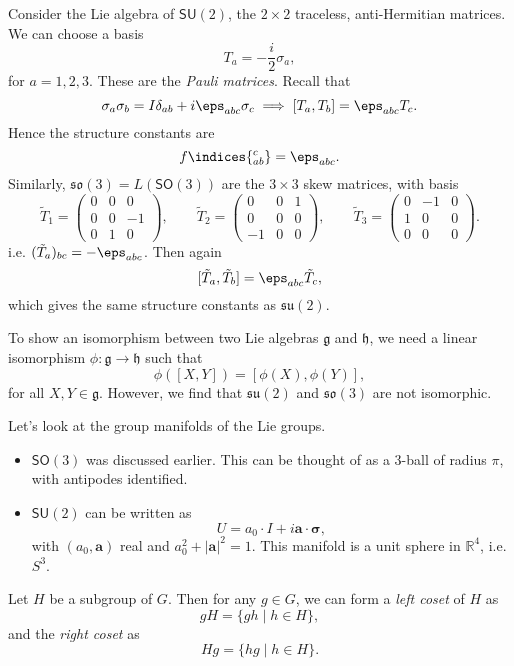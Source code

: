 \documentclass[12pt]{article}
\begin{document}
Consider the Lie algebra of $\mathsf{SU}(2)$, the $2 \times 2$ traceless, anti-Hermitian matrices. We can choose a basis
\[
T_a = - \frac{i}{2} \sigma_a,
\]
for $a = 1, 2, 3$. These are the \emph{Pauli matrices}. Recall that
\[
	\sigma_a \sigma_b = I \delta_{ab} + i \eps_{abc} \sigma_c \implies [T_a, T_b] = \eps_{abc} T_c.
\]
Hence the structure constants are
\[
f\indices{^{c}_{ab}} = \eps_{abc}.
\]
Similarly, $\mathfrak{so}(3) = L(\mathsf{SO}(3))$ are the $3 \times 3$ skew matrices, with basis
\[
\tilde T_1 =
\begin{pmatrix}
	0 & 0 & 0 \\
	0 & 0 & -1 \\
	0 & 1 & 0
\end{pmatrix},
\qquad \tilde T_2 =
\begin{pmatrix}
	0 & 0 & 1 \\
	0 & 0 & 0 \\
	-1 & 0 & 0
\end{pmatrix},
\qquad
\tilde T_3 =
\begin{pmatrix}
	0 & -1 & 0 \\
	1 & 0 & 0 \\
	0 & 0 & 0
\end{pmatrix}.
\]
i.e. $(\tilde T_a)_{bc} = - \eps_{abc}$. Then again
\[
	[\tilde T_a, \tilde T_b] = \eps_{abc} \tilde T_c,
\]
which gives the same structure constants as $\mathfrak{su}(2)$.

To show an isomorphism between two Lie algebras $\mathfrak{g}$ and $\mathfrak{h}$, we need a linear isomorphism $\phi : \mathfrak{g} \to \mathfrak{h}$ such that
\[
	\phi([X, Y]) = [\phi(X), \phi(Y)],
\]
for all $X, Y \in \mathfrak{g}$. However, we find that $\mathfrak{su}(2)$ and $\mathfrak{so}(3)$ are not isomorphic.

Let's look at the group manifolds of the Lie groups.
\begin{itemize}
	\item $\mathsf{SO}(3)$ was discussed earlier. This can be thought of as a $3$-ball of radius $\pi$, with antipodes identified.
	\item $\mathsf{SU}(2)$ can be written as
		\[
		U = a_0 \cdot I + i \mathbf{a} \cdot \bm{\sigma},
		\]
		with $(a_0, \mathbf{a})$ real and $a_0^2 + |\mathbf{a}|^2 = 1$. This manifold is a unit sphere in $\mathbb{R}^4$, i.e. $S^3$.
\end{itemize}

\begin{definition}
	Let $H$ be a subgroup of $G$. Then for any $g \in G$, we can form a \emph{left coset} of $H$ as
	\[
		gH = \{gh \mid h \in H\},
	\]
	and the \emph{right coset} as
	\[
		Hg = \{hg \mid h \in H\}.
	\]
\end{definition}
\end{document}
